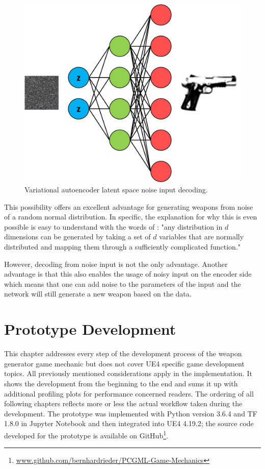 \documentclass[MGS,Master,english]{twbook}%
\begin{document}
\begin{figure}[!htbp]
	\centering
	\includegraphics[width=0.7\linewidth]{PICs/NNs/variational_autoencoder_noise_decoding}
	\caption{Variational autoencoder latent space noise input decoding.} \label{fig::vae_noise_decoding}
\end{figure}

This possibility offers an excellent advantage for generating weapons from noise of a random normal distribution. In specific, the explanation for why this is even possible is easy to understand with the words of \citep[p. 6]{ml::vae::tutorial}: "any distribution in $d$ dimensions can be generated by taking a set of $d$ variables that are normally distributed and mapping them through a sufficiently complicated function."

However, decoding from noise input is not the only advantage. Another advantage is that this also enables the usage of noisy input on the encoder side which means that one can add noise to the parameters of the input and the network will still generate a new weapon based on the data. 


%
%
\clearpage
\chapter{Prototype Development}
This chapter addresses every step of the development process of the weapon generator game mechanic but does not cover UE4 specific game development topics. All previously mentioned considerations apply in the implementation. It shows the development from the beginning to the end and sums it up with additional profiling plots for performance concerned readers. The ordering of all following chapters reflects more or less the actual workflow taken during the development. The prototype was implemented with Python version 3.6.4 and TF 1.8.0 in Jupyter Notebook and then integrated into UE4 4.19.2; the source code developed for the prototype is available on GitHub\footnote{\url{www.github.com/bernhardrieder/PCGML-Game-Mechanics}}. 
\end{document}

